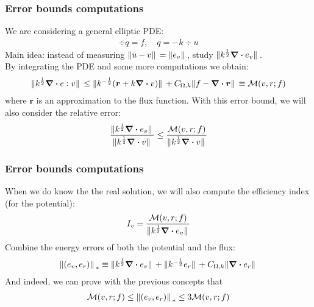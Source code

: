 \documentclass[t]{beamer}
\begin{document}
    \begin{frame}
        \frametitle{Error bounds computations}
        We are considering a general elliptic PDE:
        \begin{align*}
            \div q = f , \quad q =-k \div u
        \end{align*}
        Main idea: instead of measuring $\norm*{u-v} = \norm*{e_v}$, study $\norm*{k^{\frac{1}{2}}\div e_v}$. 
        \\ By integrating the PDE and some more computations we obtain:
        \begin{align*}
            \norm*{k^{\frac{1}{2}}\div e:v} \leq \norm*{k^{-\frac{1}{2}}(\bm{r}+k\div v)} + C_{\Omega,k}\norm*{f-\div \bm{r}} \equiv \mathcal{M}(v,r;f)
        \end{align*}
        where $\bm{r}$ is an approximation to the flux function.
        With this error bound, we will also consider the \alert{relative error}:
        \begin{align*}
            \frac{\norm*{k^{\frac{1}{2}}\div e_v}}{\norm*{k^{\frac{1}{2}}\div v}} \leq \frac{\mathcal{M}(v,r;f)}{\norm*{k^{\frac{1}{2}}\div v}}
        \end{align*}
        
    \end{frame}

    \begin{frame}
        \frametitle{Error bounds computations}
        When we do know the the real solution, we will also compute the \alert{efficiency index} (for the potential):
        \begin{align*}
            I_v = \frac{\mathcal{M}(v,r;f)}{\norm*{k^{\frac{1}{2}}\div e_v}}
        \end{align*}
        Combine the energy errors of both the potential and the flux:
        \begin{align*}
            \norm*{(e_v,e_r)}_{*} \equiv \norm*{k^{\frac{1}{2}}\div e_v} + \norm*{k^{-\frac{1}{2}}e_r} + C_{\Omega,k}\norm*{\div e_r}
        \end{align*} 
        And indeed, we can prove with the previous concepts that 
        \begin{align*}
            \mathcal{M}(v,r;f) \leq  \norm*{(e_v,e_r)}_{*}  \leq 3\mathcal{M}(v,r;f)
        \end{align*}
    \end{frame}
\end{document}
